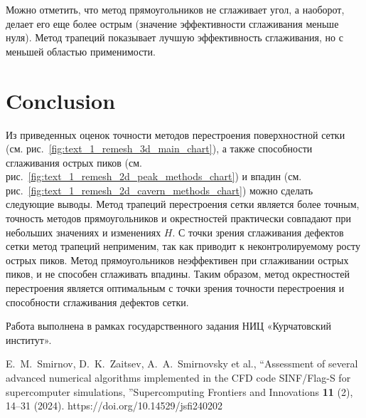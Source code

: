 \documentclass[
11pt,%
tightenlines,%
twoside,%
onecolumn,%
nofloats,%
nobibnotes,%
nofootinbib,%
superscriptaddress,%
noshowpacs,%
centertags]%
{revtex4}
\begin{document}
Можно отметить, что метод прямоугольников не сглаживает угол, а наоборот, делает его еще более острым (значение эффективности сглаживания меньше нуля).
Метод трапеций показывает лучшую эффективность сглаживания, но с меньшей областью применимости.


\section{Conclusion}

Из приведенных оценок точности методов перестроения поверхностной сетки (см. рис.~\ref{fig:text_1_remesh_3d_main_chart}), а также способности сглаживания острых пиков (см. рис.~\ref{fig:text_1_remesh_2d_peak_methods_chart}) и впадин (см. рис.~\ref{fig:text_1_remesh_2d_cavern_methods_chart}) можно сделать следующие выводы.
Метод трапеций перестроения сетки является более точным, точность методов прямоугольников и окрестностей практически совпадают при небольших значениях и изменениях $H$.
С точки зрения сглаживания дефектов сетки метод трапеций неприменим, так как приводит к неконтролируемому росту острых пиков.
Метод прямоугольников неэффективен при сглаживании острых пиков, и не способен сглаживать впадины.
Таким образом, метод окрестностей перестроения является оптимальным с точки зрения точности перестроения и способности сглаживания дефектов сетки.


\begin{acknowledgments}
Работа выполнена в рамках государственного задания НИЦ «Курчатовский институт».
\end{acknowledgments}

%
%

\begin{thebibliography}{99}

E.~M.~Smirnov, D.~K.~Zaitsev, A.~A.~Smirnovsky et al., \textquotedblleft Assessment of several advanced numerical algorithms implemented in the CFD code SINF/Flag-S for supercomputer simulations, \textquotedblright Supercomputing Frontiers and Innovations \textbf{11} (2), 14--31 (2024). https://doi.org/10.14529/jsfi240202

\end{thebibliography}
\end{document}
